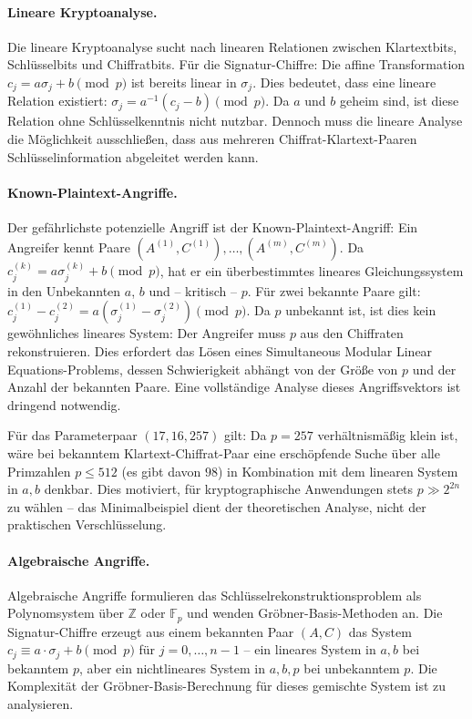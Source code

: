 ﻿\documentclass[a4paper,12pt]{scrreprt}
\theoremstyle{definition}
\begin{document}
\paragraph{Lineare Kryptoanalyse.}
Die lineare Kryptoanalyse \cite{Mat94} sucht nach linearen Relationen zwischen Klartextbits, Schlüsselbits und Chiffratbits. Für die Signatur-Chiffre: Die affine Transformation $c_j = a\sigma_j + b \pmod p$ ist bereits linear in $\sigma_j$. Dies bedeutet, dass eine lineare Relation existiert: $\sigma_j = a^{-1}(c_j - b) \pmod p$. Da $a$ und $b$ geheim sind, ist diese Relation ohne Schlüsselkenntnis nicht nutzbar. Dennoch muss die lineare Analyse die Möglichkeit ausschließen, dass aus mehreren Chiffrat-Klartext-Paaren Schlüsselinformation abgeleitet werden kann.

\paragraph{Known-Plaintext-Angriffe.}
Der gefährlichste potenzielle Angriff ist der Known-Plaintext-Angriff: Ein Angreifer kennt Paare $(A^{(1)}, C^{(1)}), \ldots, (A^{(m)}, C^{(m)})$. Da $c_j^{(k)} = a\sigma_j^{(k)} + b \pmod p$, hat er ein überbestimmtes lineares Gleichungssystem in den Unbekannten $a$, $b$ und -- kritisch -- $p$. Für zwei bekannte Paare gilt: $c_j^{(1)} - c_j^{(2)} = a(\sigma_j^{(1)} - \sigma_j^{(2)}) \pmod p$. Da $p$ unbekannt ist, ist dies kein gewöhnliches lineares System: Der Angreifer muss $p$ aus den Chiffraten rekonstruieren. Dies erfordert das Lösen eines Simultaneous Modular Linear Equations-Problems, dessen Schwierigkeit abhängt von der Größe von $p$ und der Anzahl der bekannten Paare. Eine vollständige Analyse dieses Angriffsvektors ist dringend notwendig.

Für das Parameterpaar $(17, 16, 257)$ gilt: Da $p = 257$ verhältnismäßig klein ist, wäre bei bekanntem Klartext-Chiffrat-Paar eine erschöpfende Suche über alle Primzahlen $p \leq 512$ (es gibt davon $98$) in Kombination mit dem linearen System in $a, b$ denkbar. Dies motiviert, für kryptographische Anwendungen stets $p \gg 2^{2n}$ zu wählen -- das Minimalbeispiel dient der theoretischen Analyse, nicht der praktischen Verschlüsselung.

\paragraph{Algebraische Angriffe.}
Algebraische Angriffe formulieren das Schlüsselrekonstruktionsproblem als Polynomsystem über $\mathbb{Z}$ oder $\mathbb{F}_p$ und wenden Gröbner-Basis-Methoden an. Die Signatur-Chiffre erzeugt aus einem bekannten Paar $(A, C)$ das System $c_j \equiv a \cdot \sigma_j + b \pmod p$ für $j = 0,\ldots,n-1$ -- ein lineares System in $a, b$ bei bekanntem $p$, aber ein nichtlineares System in $a, b, p$ bei unbekanntem $p$. Die Komplexität der Gröbner-Basis-Berechnung für dieses gemischte System ist zu analysieren.
\end{document}
